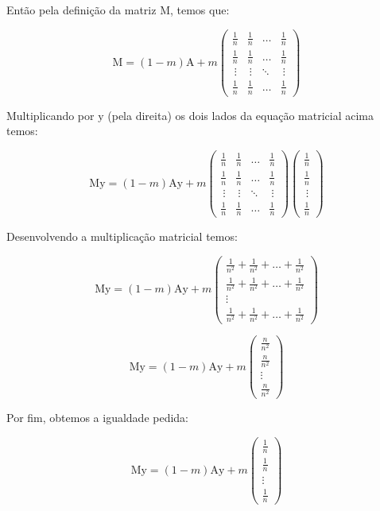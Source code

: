 \documentclass[a4paper, 12pt]{article}
\begin{document}
Então pela definição da matriz $\mathrm{M}$, temos que: 

$$\mathrm{M}=\left(1-m\right)\mathrm{A}+m\begin{pmatrix}
\frac{1}{n}&\frac{1}{n}&\dots &\frac{1}{n}\\
\frac{1}{n}&\frac{1}{n}&\dots &\frac{1}{n}\\
\ \vdots &\ \vdots &\ddots &\ \vdots \\
\frac{1}{n}&\frac{1}{n}&\dots &\frac{1}{n}
\end{pmatrix}$$

Multiplicando por $\mathrm{y}$ (pela direita) os dois lados da equação matricial acima temos: 

$$\mathrm{My}=\left(1-m\right)\mathrm{Ay}+m\begin{pmatrix}
\frac{1}{n}&\frac{1}{n}&\dots &\frac{1}{n}\\
\frac{1}{n}&\frac{1}{n}&\dots &\frac{1}{n}\\
\ \vdots &\ \vdots &\ddots &\ \vdots \\
\frac{1}{n}&\frac{1}{n}&\dots &\frac{1}{n}
\end{pmatrix}\begin{pmatrix}
\frac{1}{n}\\
\frac{1}{n}\\
\ \vdots \\
\frac{1}{n}
\end{pmatrix}$$

Desenvolvendo a multiplicação matricial temos:

$$\mathrm{My}=\left(1-m\right)\mathrm{Ay}+m\begin{pmatrix}
\frac{1}{n^2}+\frac{1}{n^2}+\dots +\frac{1}{n^2}\\
\frac{1}{n^2}+\frac{1}{n^2}+\dots +\frac{1}{n^2}\\
\vdots \\
\frac{1}{n^2}+\frac{1}{n^2}+\dots +\frac{1}{n^2}
\end{pmatrix}$$

$$\mathrm{My}=\left(1-m\right)\mathrm{Ay}+m\begin{pmatrix}
\frac{n}{n^2}\\
\frac{n}{n^2}\\
\vdots \\
\frac{n}{n^2}
\end{pmatrix}$$

Por fim, obtemos a igualdade pedida:

$$\boxed{\ \ \mathrm{My}=\left(1-m\right)\mathrm{Ay}+m\begin{pmatrix}
\frac{1}{n}\\
\frac{1}{n}\\
\vdots \\
\frac{1}{n}
\end{pmatrix}\ \ }$$
\end{document}
